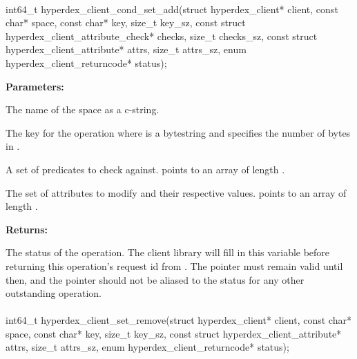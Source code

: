 \paragraph{}
\label{api:c:cond_set_add}
\begin{ccode}
int64_t hyperdex_client_cond_set_add(struct hyperdex_client* client,
                const char* space,
                const char* key, size_t key_sz,
                const struct hyperdex_client_attribute_check* checks, size_t checks_sz,
                const struct hyperdex_client_attribute* attrs, size_t attrs_sz,
                enum hyperdex_client_returncode* status);
\end{ccode}
\funcdesc 

\noindent\textbf{Parameters:}
\begin{description}[labelindent=\widthof{{\code{checks}, \code{checks\_sz}}},leftmargin=*,noitemsep,nolistsep,align=right]
\item[\code{space}] The name of the space as a c-string.
\item[\code{key}, \code{key\_sz}] The key for the operation where  is a bytestring and  specifies the number of bytes in .
\item[\code{checks}, \code{checks\_sz}] A set of predicates to check against.   points to an array of length .
\item[\code{attrs}, \code{attrs\_sz}] The set of attributes to modify and their respective values.   points to an array of length .
\end{description}

\noindent\textbf{Returns:}
\begin{description}[labelindent=\widthof{{\code{status}}},leftmargin=*,noitemsep,nolistsep,align=right]
\item[\code{status}] The status of the operation.  The client library will fill in this variable before returning this operation's request id from .  The pointer must remain valid until then, and the pointer should not be aliased to the status for any other outstanding operation.
\end{description}

\paragraph{}
\label{api:c:set_remove}
\begin{ccode}
int64_t hyperdex_client_set_remove(struct hyperdex_client* client,
                const char* space,
                const char* key, size_t key_sz,
                const struct hyperdex_client_attribute* attrs, size_t attrs_sz,
                enum hyperdex_client_returncode* status);
\end{ccode}
\funcdesc 

